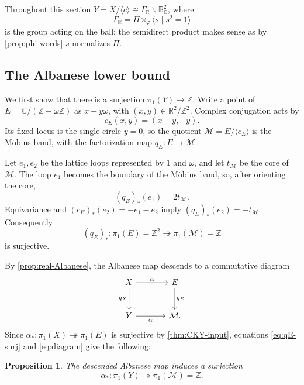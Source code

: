 \documentclass[11pt]{amsart}
\newtheorem{proposition}[theorem]{Proposition}
\theoremstyle{definition}
\theoremstyle{remark}
\newcommand{\Z}{\mathbb Z}
\newcommand{\C}{\mathbb C}
\newcommand{\B}{\mathbb B^2_{\C}}
\newcommand{\PiCS}{\Pi}
\newcommand{\omegaE}{\omega}
\newcommand{\phiA}{\varphi}
\begin{document}
Throughout this section $Y=X/\langle c\rangle\cong\Gamma_{\mathbb
  R}\backslash \B$, where
\begin{equation}\label{eq:GammaR}
 \Gamma_{\mathbb R}=\PiCS\rtimes_{\phiA}\langle s\mid s^2=1\rangle
\end{equation}
is the group acting on the ball; the semidirect product makes sense
as by \cref{prop:phi-words}
$s$ normalizes $\PiCS$. 

\subsection{The Albanese lower bound}
\label{sec:lower-bound}

We first show that there is a surjection $\pi_1(Y)\to\Z$.
Write a point of $E=\C/(\Z+\omegaE\Z)$ as $x+y\omegaE$, with
$(x,y)\in\mathbb R^2/\Z^2$.  Complex conjugation acts by
\[
 c_E(x,y)=(x-y,-y).
\]
Its fixed locus is the single circle $y=0$, so the quotient
$\mathcal M=E/\langle c_E\rangle$ is the M\"obius band, with the factorization
map $q_E\colon E\to {\mathcal {M}}$.

Let $e_1,e_2$ be the lattice loops represented by $1$ and $\omegaE$, and let
$t_{\mathcal M}$ be the core of $\mathcal M$.  The loop $e_1$ becomes the
boundary of the M\"obius band, so, after orienting the core,
\[
 (q_E)_*(e_1)=2t_{\mathcal M}.
\]
Equivariance and $(c_E)_*(e_2)=-e_1-e_2$ imply
$(q_E)_*(e_2)=-t_{\mathcal M}$.  Consequently
\begin{equation}\label{eq:qE-surj}
 (q_E)_*\colon \pi_1(E)=\Z^2\twoheadrightarrow\pi_1(\mathcal M)=\Z
\end{equation}
is surjective.

By \cref{prop:real-Albanese}, the Albanese map descends to a commutative
diagram
\begin{equation}\label{eq:diagram}
\begin{tikzcd}[column sep=large,row sep=large]
 X \arrow[r,"\alpha"] \arrow[d,"q_X"'] &
 E \arrow[d,"q_E"]\\
 Y \arrow[r,"\bar\alpha"'] & \mathcal M.
\end{tikzcd}
\end{equation}
Since $\alpha_*\colon \pi_1(X)\twoheadrightarrow\pi_1(E)$ is surjective by
\cref{thm:CKY-input}, equations \eqref{eq:qE-surj} and \eqref{eq:diagram}
give the following:

\begin{proposition}\label{prop:lower}
The descended Albanese map induces a surjection
\[
 \bar\alpha_*\colon \pi_1(Y)\twoheadrightarrow\pi_1(\mathcal M)=\Z.
\]
\end{proposition}
\end{document}
